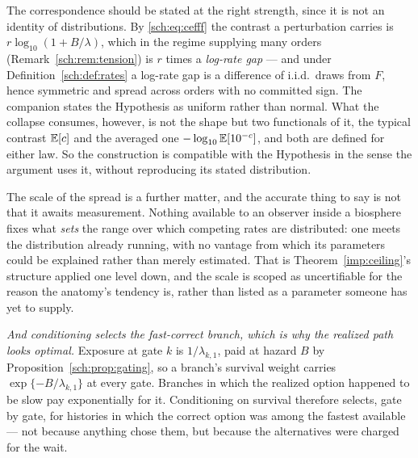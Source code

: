 The correspondence should be stated at the right strength, since it is
not an identity of distributions. By \eqref{sch:eq:cefff} the contrast a
perturbation carries is $r\log_{10}(1+B/\lambda)$, which in the
regime supplying many orders (Remark~\ref{sch:rem:tension}) is $r$ times
a \emph{log-rate gap} --- and under Definition~\ref{sch:def:rates} a
log-rate gap is a difference of i.i.d.\ draws from $F$, hence symmetric
and spread across orders with no committed sign. The companion states
the Hypothesis as uniform rather than normal. What the collapse
consumes, however, is not the shape but two functionals of it, the
typical contrast $\mathbb{E}[c]$ and the averaged one
$-\log_{10}\mathbb{E}[10^{-c}]$, and both are defined for either law. So the
construction is compatible with the Hypothesis in the sense the argument
uses it, without reproducing its stated distribution.

The scale of the spread is a further matter, and the accurate thing to say is not that it awaits measurement. Nothing available to an observer
inside a biosphere fixes what \emph{sets} the range over which competing
rates are distributed: one meets the distribution already running, with
no vantage from which its parameters could be explained rather than
merely estimated. That is Theorem~\ref{imp:ceiling}'s structure applied one
level down, and the scale is scoped as uncertifiable for the reason
the anatomy's tendency is, rather than listed as a parameter someone has yet to
supply.

\emph{And conditioning selects the fast-correct branch, which is why the
realized path looks optimal.} Exposure at gate $k$ is $1/\lambda_{k,1}$,
paid at hazard $B$ by Proposition~\ref{sch:prop:gating}, so a
branch's survival weight carries $\exp\{-B/\lambda_{k,1}\}$ at
every gate. Branches in which the realized option happened to be slow
pay exponentially for it. Conditioning on survival therefore selects,
gate by gate, for histories in which the correct option was among the
fastest available --- not because anything chose them, but because the
alternatives were charged for the wait.

